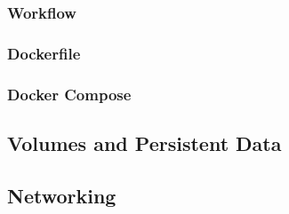 \subsubsection{Workflow}
\subsubsection{Dockerfile}
\subsubsection{Docker Compose}

\subsection{Volumes and Persistent Data}
\label{sec::arch:volumes}

\subsection{Networking}
\label{sec::arch:net}